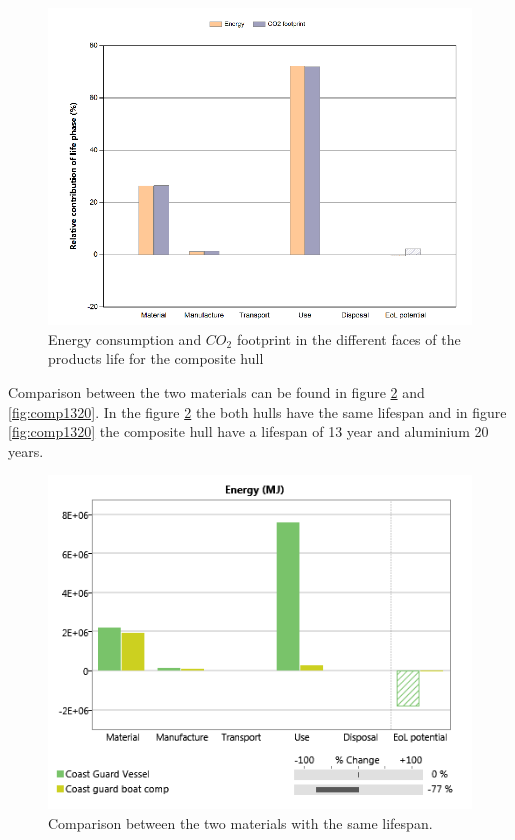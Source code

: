 \documentclass[12pt,a4paper]{article}
\begin{document}
\begin{center}
    \begin{figure}[H]
      \centering
      \includegraphics[scale=0.6]{CompFootEny.png}
       \caption{Energy consumption and $CO_2$ footprint in the different
      faces of the products life for the composite hull}
      \label{fig:CompFootEny}
    \end{figure}
\end{center}
Comparison between the two materials can be found in figure
\ref{fig:comp2020} and \ref{fig:comp1320}. In the figure
\ref{fig:comp2020} the both hulls have the same lifespan and in figure
\ref{fig:comp1320} the composite hull have a lifespan of 13 year and
aluminium 20 years.
\begin{center}
    \begin{figure}[H]
        \centering
        \includegraphics[scale=0.6]{comp2020.png}
        \caption{Comparison between the two materials with the same
        lifespan.}
        \label{fig:comp2020}
    \end{figure}
\end{center}
\end{document}
